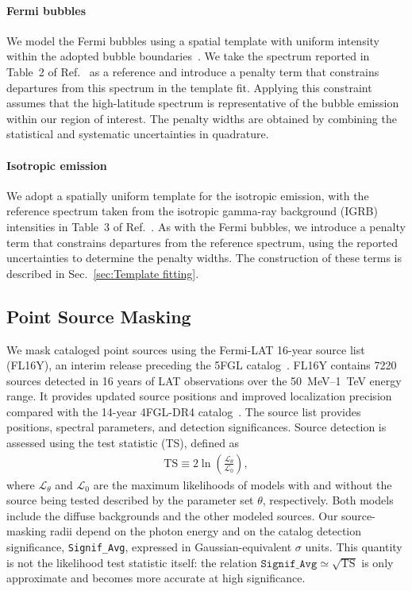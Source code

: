 \documentclass[superscriptaddress,
showpacs,preprintnumbers,nofootinbib,eqsecnum,amsmath,amssymb,aps,11pt, groupedaddress, floatfix]{revtex4-2}
\begin{document}
\paragraph{Fermi bubbles}
We model the Fermi bubbles using a spatial template with uniform intensity within the adopted bubble boundaries~\cite{Su:2010qj}. 
We take the spectrum reported in Table~2 of Ref.~\cite{Fermi-LAT:2014sfa} as a reference and introduce a penalty term that constrains departures from this spectrum in the template fit. 
Applying this constraint assumes that the high-latitude spectrum is representative of the bubble emission within our region of interest. 
The penalty widths are obtained by combining the statistical and systematic uncertainties in quadrature. 

\paragraph{Isotropic emission}
We adopt a spatially uniform template for the isotropic emission, with the reference spectrum taken from the isotropic gamma-ray background (IGRB) intensities in Table~3 of Ref.~\cite{Fermi-LAT:2014ryh}. 
As with the Fermi bubbles, we introduce a penalty term that constrains departures from the reference spectrum, using the reported uncertainties to determine the penalty widths. 
The construction of these terms is described in Sec.~\ref{sec:Template fitting}.

\subsection{Point Source Masking}

We mask cataloged point sources using the Fermi-LAT 16-year source list (FL16Y), an interim release preceding the 5FGL catalog~\cite{Ballet:2026kpq}.
FL16Y contains 7220 sources detected in 16 years of LAT observations over the 50~MeV--1~TeV energy range.
It provides updated source positions and improved localization precision compared with the 14-year 4FGL-DR4 catalog~\cite{Ballet:2026kpq}.
The source list provides positions, spectral parameters, and detection significances.
Source detection is assessed using the test statistic (TS), defined as
\begin{align}
\mathrm{TS} \equiv 2\ln\left(\frac{\mathcal{L}_\theta}{\mathcal{L}_0}\right),
\end{align}
where $\mathcal{L}_\theta$ and $\mathcal{L}_0$ are the maximum likelihoods of models with and without the source being tested described by the parameter set $\theta$, respectively.
Both models include the diffuse backgrounds and the other modeled sources. 
Our source-masking radii depend on the photon energy and on the catalog detection significance, \texttt{Signif\_Avg}, expressed in Gaussian-equivalent $\sigma$ units. This quantity is not the likelihood test statistic itself: the relation $\texttt{Signif\_Avg}\simeq\sqrt{\mathrm{TS}}$ is only approximate and becomes more accurate at high significance.
\end{document}
